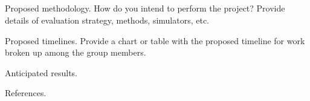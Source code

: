 \documentclass[12pt]{article}
\begin{document}
\subsection{}

\subsection{}



Proposed methodology. How do you intend to perform the project? Provide details
of evaluation strategy, methods, simulators, etc.

Proposed timelines. Provide a chart or table with the proposed timeline for work broken up
among the group members.

Anticipated results.

References.
\end{document}
